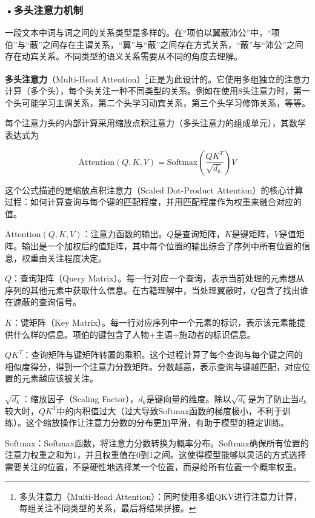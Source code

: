 \subsubsection*{\textbf{•多头注意力机制}}

一段文本中词与词之间的关系类型是多样的。在“项伯以翼蔽沛公”中，“项伯”与“蔽”之间存在主谓关系，“翼”与“蔽”之间存在方式关系，“蔽”与“沛公”之间存在动宾关系。不同类型的语义关系需要从不同的角度去理解。

\textbf{多头注意力}（Multi-Head Attention）\footnote{多头注意力（Multi-Head Attention）：同时使用多组QKV进行注意力计算，每组关注不同类型的关系，最后将结果拼接。}正是为此设计的。它使用多组独立的注意力计算（多个头），每个头关注一种不同类型的关系。例如在使用8头注意力时，第一个头可能学习主谓关系，第二个头学习动宾关系，第三个头学习修饰关系，等等。

每个注意力头的内部计算采用缩放点积注意力（多头注意力的组成单元），其数学表达式为

\[
\text{Attention}(Q, K, V) = \text{Softmax}\left(\frac{QK^T}{\sqrt{d_k}}\right)V
\]

这个公式描述的是缩放点积注意力（Scaled Dot-Product Attention）的核心计算过程：如何计算查询与每个键的匹配程度，并用匹配程度作为权重来融合对应的值。



$\text{Attention}(Q, K, V)$：注意力函数的输出。$Q$是查询矩阵，$K$是键矩阵，$V$是值矩阵。输出是一个加权后的值矩阵，其中每个位置的输出综合了序列中所有位置的信息，权重由关注程度决定。

$Q$：查询矩阵（Query Matrix）。每一行对应一个查询，表示当前处理的元素想从序列的其他元素中获取什么信息。在古籍理解中，当处理翼蔽时，$Q$包含了找出谁在遮蔽的查询信号。

$K$：键矩阵（Key Matrix）。每一行对应序列中一个元素的标识，表示该元素能提供什么样的信息。项伯的键包含了人物+主语+施动者的标识信息。

$QK^T$：查询矩阵与键矩阵转置的乘积。这个过程计算了每个查询与每个键之间的相似度得分，得到一个注意力分数矩阵。分数越高，表示查询与键越匹配，对应位置的元素越应该被关注。

$\sqrt{d_k}$：缩放因子（Scaling Factor），$d_k$是键向量的维度。除以$\sqrt{d_k}$是为了防止当$d_k$较大时，$QK^T$中的内积值过大（过大导致Softmax函数的梯度极小，不利于训练）。这个缩放操作让注意力分数的分布更加平滑，有助于模型的稳定训练。

$\text{Softmax}$：Softmax函数，将注意力分数转换为概率分布。Softmax确保所有位置的注意力权重之和为1，并且权重值在0到1之间。这使得模型能够以灵活的方式选择需要关注的位置，不是硬性地选择某一个位置，而是给所有位置一个概率权重。

